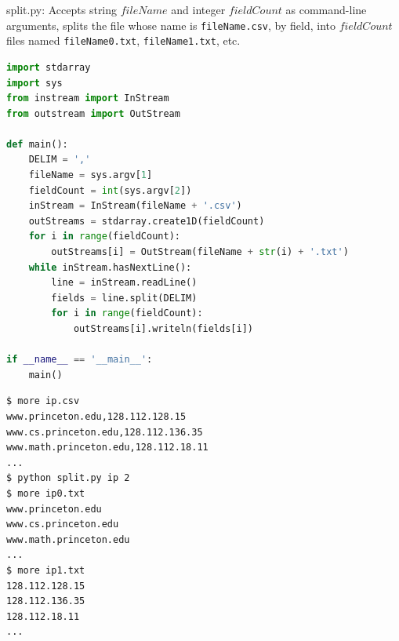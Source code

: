 \documentclass[8pt,a4paper,compress,handout]{beamer}
\begin{document}
\begin{frame}[fragile]
\begin{framed}
\tiny split.py: Accepts string $fileName$ and integer $fieldCount$ as command-line arguments, splits the file whose name is \lstinline{fileName.csv}, by field, into $fieldCount$ files named \lstinline{fileName0.txt}, \lstinline{fileName1.txt}, etc.
\end{framed}

\begin{lstlisting}[language=Python]
import stdarray
import sys
from instream import InStream
from outstream import OutStream

def main():
    DELIM = ','
    fileName = sys.argv[1]
    fieldCount = int(sys.argv[2])
    inStream = InStream(fileName + '.csv')
    outStreams = stdarray.create1D(fieldCount)
    for i in range(fieldCount):
        outStreams[i] = OutStream(fileName + str(i) + '.txt')
    while inStream.hasNextLine():
        line = inStream.readLine()
        fields = line.split(DELIM)
        for i in range(fieldCount):
            outStreams[i].writeln(fields[i])

if __name__ == '__main__':
    main()
\end{lstlisting}
\end{frame}

\begin{frame}[fragile]
\begin{lstlisting}[language={}]
$ more ip.csv 
www.princeton.edu,128.112.128.15
www.cs.princeton.edu,128.112.136.35
www.math.princeton.edu,128.112.18.11
...
$ python split.py ip 2
$ more ip0.txt
www.princeton.edu
www.cs.princeton.edu
www.math.princeton.edu
...
$ more ip1.txt
128.112.128.15
128.112.136.35
128.112.18.11
...
\end{lstlisting}
\end{frame}
\end{document}

